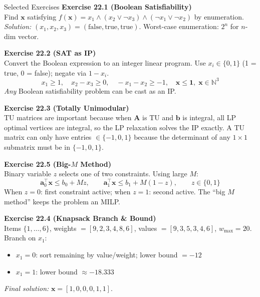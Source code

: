 \documentclass[aspectratio=169,10pt]{beamer}
\newcommand{\bx}{\mathbf{x}}
\newcommand{\bb}{\mathbf{b}}
\newcommand{\bA}{\mathbf{A}}
\newcommand{\NN}{\mathbb{N}}
\begin{document}
\begin{frame}[allowframebreaks]{Selected Exercises}
  \textbf{Exercise 22.1 (Boolean Satisfiability)}\\
  Find $\bx$ satisfying $f(\bx) = x_1 \land (x_2 \lor \lnot x_3)
  \land (\lnot x_1 \lor \lnot x_2)$ by enumeration.
  \textit{Solution:} $(x_1, x_2, x_3) = (\text{false}, \text{true},
  \text{true})$.  Worst-case enumeration: $2^n$ for $n$-dim vector.

  \vspace{6pt}
  \textbf{Exercise 22.2 (SAT as IP)}\\
  Convert the Boolean expression to an integer linear program.
  Use $x_i \in \{0,1\}$ (1 = true, 0 = false); negate via $1 - x_i$.
  \[
    x_1 \geq 1, \quad x_2 - x_3 \geq 0, \quad
    -x_1 - x_2 \geq -1, \quad \bx \leq \mathbf{1},\; \bx \in \NN^3
  \]
  \textit{Any} Boolean satisfiability problem can be cast as an IP.

  \vspace{6pt}
  \textbf{Exercise 22.3 (Totally Unimodular)}\\
  TU matrices are important because when $\bA$ is TU and $\bb$ is integral,
  all LP optimal vertices are integral, so the LP relaxation solves the IP
  exactly.  A TU matrix can only have entries $\in \{-1, 0, 1\}$ because
  the determinant of any $1 \times 1$ submatrix must be in $\{-1, 0, 1\}$.

  \vspace{6pt}
  \textbf{Exercise 22.5 (Big-$M$ Method)}\\
  Binary variable $z$ selects one of two constraints.  Using large $M$:
  \[
    \mathbf{a}_0^\top\bx \leq b_0 + Mz, \qquad
    \mathbf{a}_1^\top\bx \leq b_1 + M(1-z), \qquad
    z \in \{0,1\}
  \]
  When $z=0$: first constraint active; when $z=1$: second active.
  The ``big $M$ method'' keeps the problem an MILP.

  \vspace{6pt}
  \textbf{Exercise 22.4 (Knapsack Branch \& Bound)}\\
  Items $\{1,\ldots,6\}$, weights $= [9,2,3,4,8,6]$,
  values $= [9,3,5,3,4,6]$, $w_{\max} = 20$.
  Branch on $x_1$:
  \begin{itemize}
    \item $x_1 = 0$: sort remaining by value/weight; lower bound $= -12$
    \item $x_1 = 1$: lower bound $\approx -18.333$
  \end{itemize}
  \textit{Final solution:} $\bx = [1, 0, 0, 0, 1, 1]$.
\end{frame}
\end{document}
